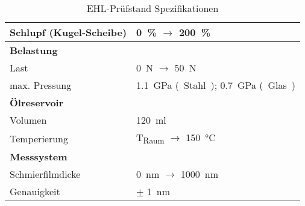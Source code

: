 \begin{table}[htb]
\begin{tabular}{m{5cm}l}
        Schlupf (Kugel-Scheibe) & \SI{0}{\percent} $\rightarrow$ \SI{200}{\percent}                                                         \\
        \hline
        \textbf{Belastung}      &                                                                                                           \\
        Last                    & \SI{0}{\newton} $\rightarrow$ \SI{50}{\newton}                                                            \\
        max. Pressung           & \SI{1.1}{\giga\pascal} \si{(Stahl)}; \SI{0.7}{\giga\pascal} \si{(Glas)}                                   \\
        \hline
        \textbf{Ölreservoir}    &                                                                                                           \\
        Volumen                 & \SI{120}{\milli\litre}                                                                                    \\
        Temperierung            & \si{T_{Raum}} $\rightarrow$ \SI{150}{\degreeCelsius}                                                      \\
        \hline
        \textbf{Messsystem}     &                                                                                                           \\
        Schmierfilmdicke        & \SI{0}{\nano\meter} $\rightarrow$ \SI{1000}{\nano\meter}                                                  \\
        Genauigkeit             & $\pm$ \SI{1}{\nano\meter}                                                                                 \\
    \end{tabular}
    \caption{EHL-Prüfstand Spezifikationen \cite{ehl}}
    \label{tab:ehl_specs}
\end{table}
